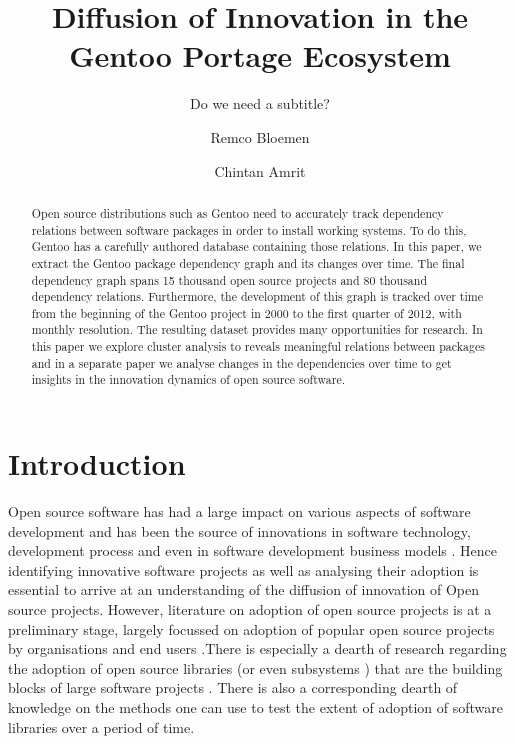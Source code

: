 \documentclass[smallextended,final]{svjour3}
\begin{document}
\title{Diffusion of Innovation in the Gentoo Portage Ecosystem}
\subtitle{Do we need a subtitle?} 
\dedication{}
\author{Remco Bloemen \and Chintan Amrit}

\maketitle


\begin{abstract}
Open source distributions such as Gentoo need to accurately track dependency relations between software packages in order to install working systems. To do this, Gentoo has a carefully authored database containing those relations. In this paper, we extract the Gentoo package dependency graph and its changes over time. The final dependency graph spans 15 thousand open source projects and 80 thousand dependency relations. Furthermore, the development of this graph is tracked over time from the beginning of the Gentoo project in 2000 to the first quarter of 2012, with monthly resolution. The resulting dataset provides many opportunities for research. In this paper we explore cluster analysis to reveals meaningful relations between packages and in a separate paper we analyse changes in the dependencies over time to get insights in the innovation dynamics of open source software.
\end{abstract}


\section{Introduction}


Open source software has had a large impact on various aspects of software development and has been the source of  innovations in software technology, development process and even in software development business models \citep{ebert07}. Hence identifying innovative software projects as well as analysing their adoption is essential to arrive at an understanding of the diffusion of innovation of Open source projects. However, literature on adoption of open source projects is at a preliminary stage, largely focussed on adoption of popular open source projects by organisations and end users \citep{aksulu10}.There is especially a dearth of research regarding the adoption of open source libraries (or even subsystems \citep{maccormack06}) that are the building blocks of large software projects \citep{szyperski04}. There is also a corresponding dearth of knowledge on the methods one can use to test the extent of adoption of software libraries over a period of time. 
\end{document}
